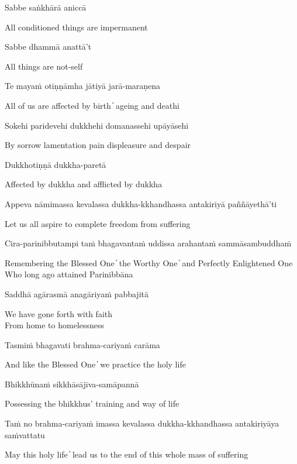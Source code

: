 Sabbe saṅkhārā aniccā

\begin{cprenglish}
All conditioned things are impermanent
\end{cprenglish}

Sabbe dhammā anattā't

\begin{cprenglish}
All things are not-self
\end{cprenglish}

Te mayaṁ otiṇṇāmha jātiyā jarā-maraṇena

\begin{cprenglish}
All of us are affected by birth  ̓  ageing and deathi
\end{cprenglish}

Sokehi paridevehi dukkhehi domanassehi upāyāsehi

\begin{cprenglish}
By sorrow lamentation pain displeasure and despair
\end{cprenglish}

Dukkhotiṇṇā dukkha-paretā

\begin{cprenglish}
Affected by dukkha and afflicted by dukkha
\end{cprenglish}

Appeva nāmimassa kevalassa dukkha-kkhandhassa antakiriyā paññāyethā'ti

\begin{cprenglish}
Let us all aspire to complete freedom from suffering
\end{cprenglish}

Cira-parinibbutampi taṁ bhagavantaṁ uddissa arahantaṁ sammāsambuddhaṁ

\begin{cprenglish}
Remembering the Blessed One  ̓  the Worthy One  ̓  and Perfectly Enlightened One\\
Who long ago attained Parinibbāna
\end{cprenglish}

Saddhā agārasmā anagāriyaṁ pabbajitā

\begin{cprenglish}
We have gone forth with faith\\
From home to homelessness
\end{cprenglish}

Tasmiṁ bhagavati brahma-cariyaṁ carāma

\begin{cprenglish}
And like the Blessed One  ̓  we practice the holy life
\end{cprenglish}

Bhikkhūnaṁ sikkhāsājīva-samāpannā

\begin{cprenglish}
Possessing the bhikkhus’ training and way of life
\end{cprenglish}

Taṁ no brahma-cariyaṁ imassa kevalassa dukkha-kkhandhassa antakiriyāya saṁvattatu

\begin{cprenglish}
May this holy life  ̓  lead us to the end of this whole mass of suffering
\end{cprenglish}


